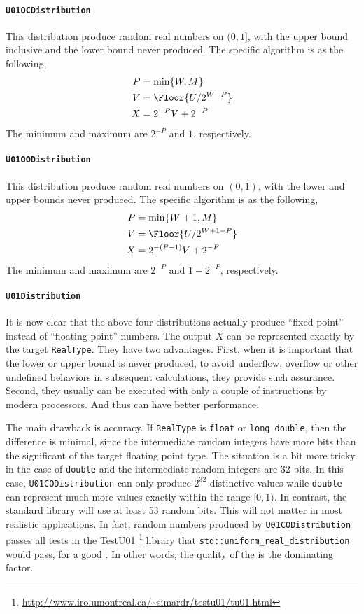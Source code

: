 \paragraph{\texttt{U01OCDistribution}}

This distribution produce random real numbers on $(0, 1]$, with the upper bound
inclusive and the lower bound never produced. The specific algorithm is as the
following,
\begin{align*}
  P &= \min\{W, M\} \\
  V &= \Floor{U / 2^{W - P}} \\
  X &= 2^{-P} V + 2^{-P}
\end{align*}
The minimum and maximum are $2^{-P}$ and $1$, respectively.

\paragraph{\texttt{U01OODistribution}}

This distribution produce random real numbers on $(0, 1)$, with the lower and
upper bounds never produced. The specific algorithm is as the following,
\begin{align*}
  P &= \min\{W + 1, M\} \\
  V &= \Floor{U / 2^{W + 1 - P}} \\
  X &= 2^{-(P - 1)} V + 2^{-P}
\end{align*}
The minimum and maximum are $2^{-P}$ and $1 - 2^{-P}$, respectively.

\paragraph{\texttt{U01Distribution}}

It is now clear that the above four distributions actually produce ``fixed
point'' instead of ``floating point'' numbers. The output $X$ can be
represented exactly by the target \verb|RealType|. They have two advantages.
First, when it is important that the lower or upper bound is never produced, to
avoid underflow, overflow or other undefined behaviors in subsequent
calculations, they provide such assurance. Second, they usually can be executed
with only a couple of instructions by modern processors. And thus can have
better performance.

The main drawback is accuracy. If \verb|RealType| is \verb|float| or
\verb|long double|, then the difference is minimal, since the intermediate
random integers have more bits than the significant of the target floating
point type. The situation is a bit more tricky in the case of \verb|double| and
the intermediate random integers are 32-bits. In this case,
\verb|U01CODistribution| can only produce $2^{32}$ distinctive values while
\verb|double| can represent much more values exactly within the range $[0, 1)$.
In contrast, the standard library will use at least 53 random bits. This will
not matter in most realistic applications. In fact, random numbers produced by
\verb|U01CODistribution| passes all tests in the {\lnfigures\tbfigures
  TestU01}%
\footnote{\url{http://www.iro.umontreal.ca/~simardr/testu01/tu01.html}} library
that \verb|std::uniform_real_distribution| would pass, for a good \rng. In
other words, the quality of the \rng is the dominating factor.

